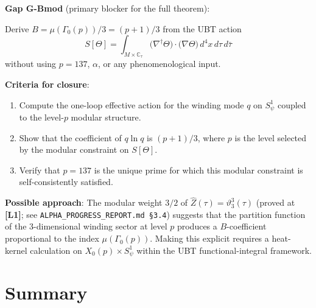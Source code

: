 \documentclass[12pt,a4paper]{article}
\theoremstyle{definition}
\theoremstyle{remark}
\newcommand{\CC}{\mathbb{C}}
\newcommand{\vth}{\vartheta}
\newcommand{\Lone}{\textbf{[L1]}}
\begin{document}
\begin{gapbox}
\textbf{Gap G-Bmod} (primary blocker for the full theorem):

\medskip
Derive $B = \mu(\Gamma_0(p))/3 = (p+1)/3$ from the UBT action
\[
  S[\Theta] = \int_{M \times \CC_\tau}
              \bigl(\nabla^\dagger\Theta\bigr) \cdot \bigl(\nabla\Theta\bigr)\,
              d^4x\,d\tau\,d\bar\tau
\]
without using $p = 137$, $\alpha$, or any phenomenological input.

\medskip
\textbf{Criteria for closure}:
\begin{enumerate}
  \item Compute the one-loop effective action for the winding mode $q$ on $S^1_\psi$
        coupled to the level-$p$ modular structure.
  \item Show that the coefficient of $q\ln q$ is $(p+1)/3$, where $p$ is
        the level selected by the modular constraint on $S[\Theta]$.
  \item Verify that $p = 137$ is the unique prime for which this modular constraint
        is self-consistently satisfied.
\end{enumerate}

\medskip
\textbf{Possible approach}: The modular weight $3/2$ of
$\hat{Z}(\tau) = \vth_3^3(\tau)$ (proved at \Lone; see \texttt{ALPHA\_PROGRESS\_REPORT.md
\S3.4}) suggests that the partition function of the 3-dimensional winding sector
at level $p$ produces a $B$-coefficient proportional to the index $\mu(\Gamma_0(p))$.
Making this explicit requires a heat-kernel calculation on
$X_0(p) \times S^1_\psi$ within the UBT functional-integral framework.
\end{gapbox}

\section{Summary}
\label{sec:mpat:summary}
\end{document}
